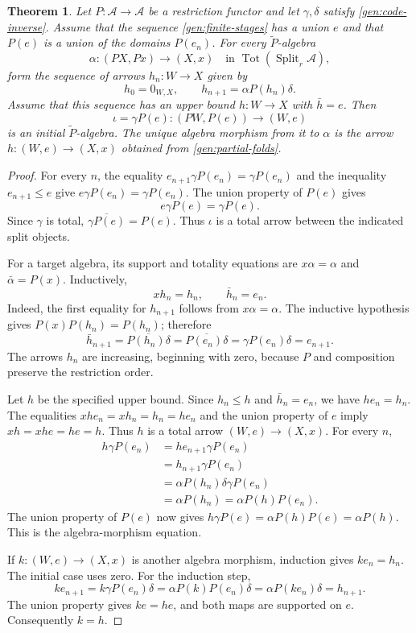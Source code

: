 \documentclass[11pt]{article}
\newtheorem{theorem}{Theorem}[section]
\theoremstyle{definition}
\theoremstyle{remark}
\newcommand{\Tot}{\operatorname{Tot}}
\begin{document}
\begin{theorem}\label{gen:initial}
Let $P:\mathscr A\to\mathscr A$ be a restriction functor and let
$\gamma,\delta$ satisfy \eqref{gen:code-inverse}. Assume that the
sequence \eqref{gen:finite-stages} has a union $e$ and that $P(e)$ is
a union of the domains $P(e_n)$. For every $\widetilde P$-algebra
\[
 \alpha:(PX,Px)\longrightarrow(X,x)
 \quad\text{in }\Tot(\operatorname{Split}_r\mathscr A),
\]
form the sequence of arrows $h_n:W\to X$ given by
\begin{equation}\label{gen:partial-folds}
 h_0=0_{W,X},\qquad h_{n+1}=\alpha P(h_n)\delta.
\end{equation}
Assume that this sequence has an upper bound $h:W\to X$ with
$\bar h=e$. Then
\[
 \iota=\gamma P(e):(PW,P(e))\longrightarrow(W,e)
\]
is an initial $\widetilde P$-algebra. The unique algebra morphism from
it to $\alpha$ is the arrow $h:(W,e)\to(X,x)$ obtained from
\eqref{gen:partial-folds}.
\end{theorem}
\begin{proof}
For every $n$, the equality
$e_{n+1}\gamma P(e_n)=\gamma P(e_n)$ and the inequality
$e_{n+1}\le e$ give
$e\gamma P(e_n)=\gamma P(e_n)$. The union property of $P(e)$ gives
\[
 e\gamma P(e)=\gamma P(e).
\]
Since $\gamma$ is total, $\overline{\gamma P(e)}=P(e)$.
Thus $\iota$ is a total arrow between the indicated split objects.

For a target algebra, its support and totality equations are
$x\alpha=\alpha$ and $\bar\alpha=P(x)$. Inductively,
\[
 xh_n=h_n,\qquad \bar h_n=e_n.
\]
Indeed, the first equality for $h_{n+1}$ follows from
$x\alpha=\alpha$. The inductive hypothesis gives
$P(x)P(h_n)=P(h_n)$; therefore
\[
 \bar h_{n+1}
 =\overline{P(h_n)\delta}
 =\overline{P(e_n)\delta}
 =\gamma P(e_n)\delta=e_{n+1}.
\]
The arrows $h_n$ are increasing, beginning with zero, because $P$ and
composition preserve the restriction order.

Let $h$ be the specified upper bound. Since $h_n\le h$ and
$\bar h_n=e_n$, we have $he_n=h_n$. The equalities
$xhe_n=xh_n=h_n=he_n$ and the union property of $e$ imply
$xh=xhe=he=h$. Thus $h$ is a total arrow $(W,e)\to(X,x)$.
For every $n$,
\begin{align*}
 h\gamma P(e_n)
 &=he_{n+1}\gamma P(e_n)\\
 &=h_{n+1}\gamma P(e_n)\\
 &=\alpha P(h_n)\delta\gamma P(e_n)\\
 &=\alpha P(h_n)
  =\alpha P(h)P(e_n).
\end{align*}
The union property of $P(e)$ now gives
$h\gamma P(e)=\alpha P(h)P(e)=\alpha P(h)$.
This is the algebra-morphism equation.

If $k:(W,e)\to(X,x)$ is another algebra morphism, induction gives
$ke_n=h_n$. The initial case uses zero. For the induction step,
\[
 ke_{n+1}
 =k\gamma P(e_n)\delta
 =\alpha P(k)P(e_n)\delta
 =\alpha P(ke_n)\delta=h_{n+1}.
\]
The union property gives $ke=he$, and both maps are supported on $e$.
Consequently $k=h$.
\end{proof}
\end{document}
